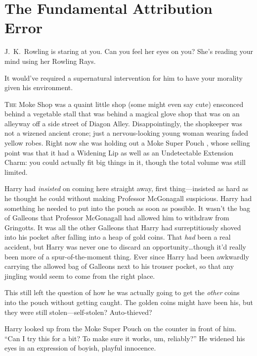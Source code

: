 \chapter{The Fundamental Attribution Error}

\begin{chapterOpeningAuthorNote}
J.~K.~Rowling is staring at you. Can you feel her eyes on you? She's reading your mind using her Rowling Rays.
\end{chapterOpeningAuthorNote}
\begin{chapterOpeningQuote}
It would've required a supernatural intervention for him to have your morality given his environment.
\end{chapterOpeningQuote}

\lettrine{T}{he} Moke Shop was a quaint little shop (some might even say cute) ensconced behind a vegetable stall that was behind a magical glove shop that was on an alleyway off a side street of Diagon Alley. Disappointingly, the shopkeeper was not a wizened ancient crone; just a nervous-looking young woman wearing faded yellow robes. Right now she was holding out a Moke Super Pouch , whose selling point was that it had a Widening Lip as well as an Undetectable Extension Charm: you could actually fit big things in it, though the total volume was still limited.

Harry had \emph{insisted} on coming here straight away, first thing—insisted as hard as he thought he could without making Professor McGonagall suspicious. Harry had something he needed to put into the pouch as soon as possible. It wasn’t the bag of Galleons that Professor McGonagall had allowed him to withdraw from Gringotts. It was all the other Galleons that Harry had surreptitiously shoved into his pocket after falling into a heap of gold coins. That \emph{had} been a real accident, but Harry was never one to discard an opportunity…though it’d really been more of a spur-of-the-moment thing. Ever since Harry had been awkwardly carrying the allowed bag of Galleons next to his trouser pocket, so that any jingling would seem to come from the right place.

This still left the question of how he was actually going to get the \emph{other} coins into the pouch without getting caught. The golden coins might have been his, but they were still stolen—self-stolen? Auto-thieved?

Harry looked up from the Moke Super Pouch  on the counter in front of him. “Can I try this for a bit? To make sure it works, um, reliably?” He widened his eyes in an expression of boyish, playful innocence.

